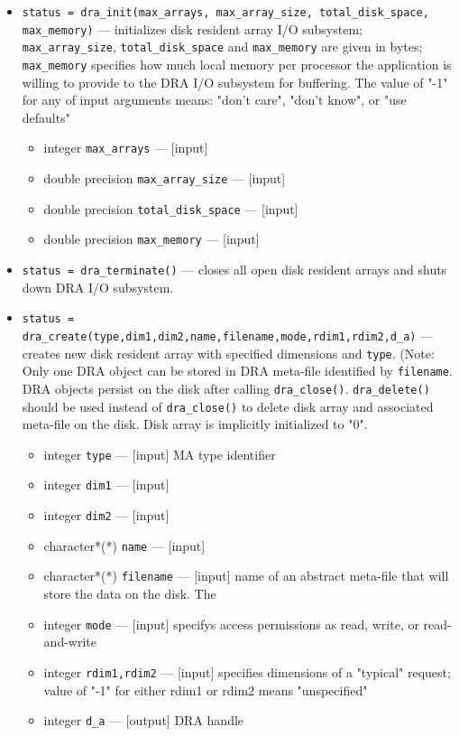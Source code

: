 \begin{itemize}
\item {\tt status = dra\_init(max\_arrays, max\_array\_size, total\_disk\_space, max\_memory)} ---
              initializes disk resident array I/O subsystem;
              {\tt max\_array\_size}, {\tt total\_disk\_space} and  {\tt max\_memory} are given
              in bytes; 
              {\tt max\_memory} specifies how much local memory per processor the
              application is willing to provide to the DRA I/O subsystem for
              buffering. 
              The value of "-1" for any of input arguments means:
              "don't care", "don't know", or "use defaults" 
\begin{itemize}
\item              integer {\tt max\_arrays} --- [input]
\item              double precision {\tt max\_array\_size} --- [input]
\item              double precision {\tt total\_disk\_space} --- [input]
\item              double precision {\tt max\_memory} --- [input]
\end{itemize}


\item {\tt status = dra\_terminate()} ---
              closes all open disk resident arrays and shuts down 
              DRA I/O subsystem.

\item {\tt status = dra\_create(type,dim1,dim2,name,filename,mode,rdim1,rdim2,d\_a)} ---
              creates new disk resident array with specified dimensions
              and {\tt type}.
	      (Note: Only one DRA object can be stored in DRA meta-file identified by
	      {\tt filename}.
              DRA objects persist on the disk after calling {\tt dra\_close()}.
              {\tt dra\_delete()} should be used instead of {\tt dra\_close()} to delete disk
              array and associated meta-file on the disk.
              Disk array is implicitly initialized to "0".

\begin{itemize}
\item              integer {\tt type} ---  [input]  MA type identifier
\item              integer {\tt dim1} --- [input]
\item              integer {\tt dim2} --- [input]
\item              character*(*) {\tt name} --- [input]
\item              character*(*) {\tt filename} --- [input]
      name of an abstract
      meta-file that will store the data on the disk. The
\item              integer {\tt mode} --- [input] specifys access permissions
as read, write, or read-and-write
\item              integer {\tt rdim1,rdim2} --- [input] 
      specifies dimensions of a
	      "typical" request;  value of "-1" for either rdim1 or rdim2
           means "unspecified"
\item              integer {\tt d\_a} --- [output]   DRA handle
\end{itemize}


\end{itemize}
